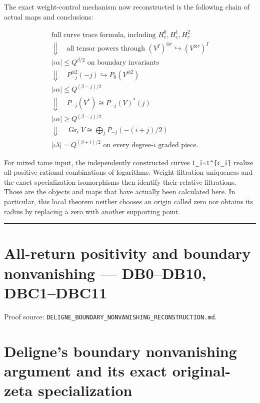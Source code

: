 \documentclass[
]{report}
\begin{document}
The exact weight-control mechanism now reconstructed is the following
chain of actual maps and conclusions:

\[
\begin{array}{c}
\text{full curve trace formula, including }H_c^0,H_c^1,H_c^2
\\\Downarrow\quad\text{all tensor powers through }(V^I)^{\otimes r}\hookrightarrow(V^{\otimes r})^I
\\ |\iota\alpha|\le Q^{\beta/2}\text{ on boundary invariants}
\\\Downarrow\quad P_{-j}^{\otimes2}(-j)\hookrightarrow P_0(V^{\otimes2})
\\ |\iota\alpha|\le Q^{(\beta-j)/2}
\\\Downarrow\quad P_{-j}(V^*)\cong P_{-j}(V)^*(j)
\\ |\iota\alpha|\ge Q^{(\beta-j)/2}
\\\Downarrow\quad\operatorname{Gr}_i V\cong\bigoplus_jP_{-j}(-(i+j)/2)
\\ |\iota\lambda|=Q^{(\beta+i)/2}\text{ on every degree-}i\text{ graded piece}.
\end{array}
\tag{DLM15.1}
\]

For mixed tame input, the independently constructed curves
\texttt{t\_i=t\^{}\{c\_i\}} realize all positive rational combinations
of logarithms. Weight-filtration uniqueness and the exact specialization
isomorphisms then identify their relative filtrations. Those are the
objects and maps that have actually been calculated here. In particular,
this local theorem neither chooses an origin called zero nor obtains its
radius by replacing a zero with another supporting point.

\begin{center}\rule{0.5\linewidth}{0.5pt}\end{center}

\chapter{All-return positivity and boundary nonvanishing --- DB0--DB10,
DBC1--DBC11}\label{all-return-positivity-and-boundary-nonvanishing-db0db10-dbc1dbc11}

Proof source:
\nolinkurl{DELIGNE_BOUNDARY_NONVANISHING_RECONSTRUCTION.md}.

\chapter{Deligne's boundary nonvanishing argument and its exact
original-zeta
specialization}\label{delignes-boundary-nonvanishing-argument-and-its-exact-original-zeta-specialization}
\end{document}
